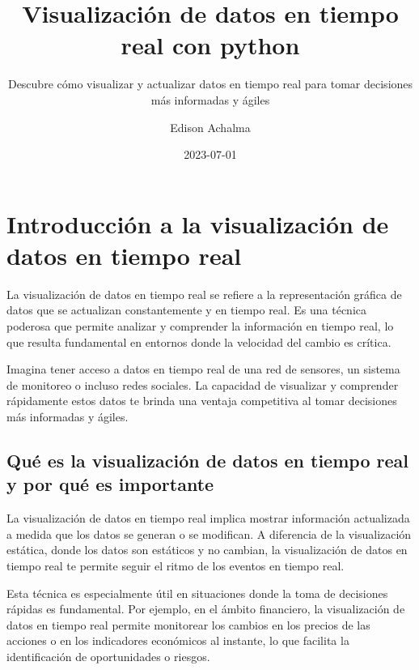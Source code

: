 \documentclass[
  a4paper,
]{article}
\title{Visualización de datos en tiempo real con python}
\subtitle{Descubre cómo visualizar y actualizar datos en tiempo real
para tomar decisiones más informadas y ágiles}
\author{Edison Achalma}
\date{2023-07-01}
\begin{document}
\maketitle
\ifdefined\Shaded\renewenvironment{Shaded}{\begin{tcolorbox}[interior hidden, frame hidden, sharp corners, borderline west={3pt}{0pt}{shadecolor}, boxrule=0pt, breakable, enhanced]}{\end{tcolorbox}}\fi

\hypertarget{introducciuxf3n-a-la-visualizaciuxf3n-de-datos-en-tiempo-real}{%
\section{Introducción a la visualización de datos en tiempo
real}\label{introducciuxf3n-a-la-visualizaciuxf3n-de-datos-en-tiempo-real}}

La visualización de datos en tiempo real se refiere a la representación
gráfica de datos que se actualizan constantemente y en tiempo real. Es
una técnica poderosa que permite analizar y comprender la información en
tiempo real, lo que resulta fundamental en entornos donde la velocidad
del cambio es crítica.

Imagina tener acceso a datos en tiempo real de una red de sensores, un
sistema de monitoreo o incluso redes sociales. La capacidad de
visualizar y comprender rápidamente estos datos te brinda una ventaja
competitiva al tomar decisiones más informadas y ágiles.

\hypertarget{quuxe9-es-la-visualizaciuxf3n-de-datos-en-tiempo-real-y-por-quuxe9-es-importante}{%
\subsection{Qué es la visualización de datos en tiempo real y por qué es
importante}\label{quuxe9-es-la-visualizaciuxf3n-de-datos-en-tiempo-real-y-por-quuxe9-es-importante}}

La visualización de datos en tiempo real implica mostrar información
actualizada a medida que los datos se generan o se modifican. A
diferencia de la visualización estática, donde los datos son estáticos y
no cambian, la visualización de datos en tiempo real te permite seguir
el ritmo de los eventos en tiempo real.

Esta técnica es especialmente útil en situaciones donde la toma de
decisiones rápidas es fundamental. Por ejemplo, en el ámbito financiero,
la visualización de datos en tiempo real permite monitorear los cambios
en los precios de las acciones o en los indicadores económicos al
instante, lo que facilita la identificación de oportunidades o riesgos.
\end{document}
